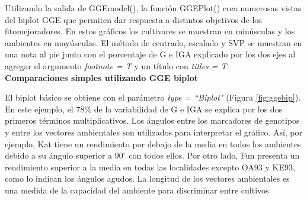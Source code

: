 Utilizando la salida de \textcolor{fandango}{GGEmodel()}, la función 
\textcolor{fandango}{GGEPlot()} crea numerosas vistas del biplot GGE que permiten dar respuesta a distintos objetivos de los fitomejoradores. En estos gráficos los cultivares se muestran en minúsculas y los ambientes en mayúsculas. El método de centrado, escalado y SVP se muestran en una nota al pie junto con el porcentaje de G e IGA explicado por los dos ejes al agregar el argumento \emph{footnote = T} y un título con \emph{titles = T}. \\

\textbf{Comparaciones simples utilizando GGE biplot}

El biplot básico se obtiene con el parámetro \emph{type = ``Biplot"} (Figura \ref{fig:ggebip}). En este ejemplo, el 78\% de la variabilidad de G e IGA se explica por los dos primeros términos multiplicativos. Los ángulos entre los marcadores de genotipos y entre los vectores ambientales son utilizados para interpretar el gráfico. Así, por ejemplo, Kat tiene un rendimiento por debajo de la media en todos los ambientes debido a su ángulo superior a $90^{\circ}$ con todos ellos. Por otro lado, Fun presenta un rendimiento superior a la media en todas las localidades excepto OA93 y KE93, como lo indican los ángulos agudos. La longitud de los vectores ambientales es una medida de la capacidad del ambiente para discriminar entre cultivos. 



